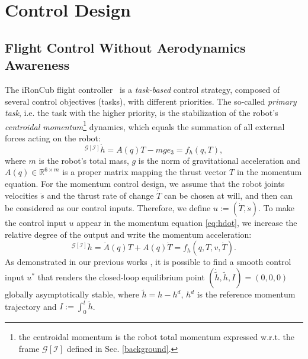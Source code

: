 \section{Control Design}
\label{sec:control}

\subsection{Flight Control Without Aerodynamics Awareness}
\label{subsec:Flight-Control-no-aerodyn-forces}
The iRonCub flight controller~\cite{c1, c2} is a \emph{task-based} control strategy, composed of several control objectives (tasks), with different priorities. The so-called \emph{primary task}, i.e. the task with the higher priority, is the stabilization of the robot's \emph{centroidal momentum}\footnote{the centroidal momentum is the robot total momentum expressed w.r.t. the frame $\mathcal{G}[\mathcal{I}]$  defined in Sec. \ref{background}.} dynamics, which equals the summation of all external forces acting on the robot:
%
\begin{equation}
\label{eq:hdot}
   {}^{\mathcal{G}[\mathcal{I}]}\dot{h}=A(q)T-mge_3=f_h(q,T),
\end{equation}
where $m$ is the robot's total mass, $g$ is the norm of gravitational acceleration and $A(q) \in \mathbb{R}^{6 \times m}$ is a proper matrix mapping the thrust vector $T$ in the momentum equation. For the momentum control design, we assume that the robot joints velocities $\dot{s}$ and the thrust rate of change $\dot{T}$ can be chosen at will, and then can be considered as our control inputs. Therefore, we define $u := (\dot{T}, \dot{s})$. To make the control input $u$ appear in the momentum equation \eqref{eq:hdot}, we increase the relative degree of the output and write the momentum acceleration:
%
\begin{equation}
\label{eq:hddot}
   {}^{\mathcal{G}[\mathcal{I}]}\ddot{h}=\dot{A}(q)T+A(q)\dot{T} = f_h(q, T, v, \dot{T}).
\end{equation}
%
As demonstrated in our previous works \cite{c1,c2}, it is possible to find a smooth control input $u^*$ that renders the closed-loop equilibrium point $(\dot{\tilde{h}}, \tilde{h}, I) = (0,0,0)$ globally asymptotically stable, where $\tilde{h} = h-h^d$, $h^d$ is the reference momentum trajectory and $I := \int_0^t \tilde{h}$. 

